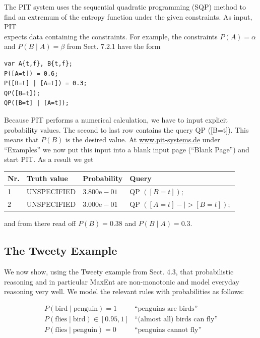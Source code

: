 \documentclass[10pt]{book}
\begin{document}
The PIT system uses the sequential quadratic programming (SQP) method to find an extremum of the entropy function under the given constraints. As input, PIT\\
expects data containing the constraints. For example, the constraints $P(A)=\alpha$ and $P(B \mid A)=\beta$ from Sect. 7.2.1 have the form
\begin{verbatim}
var A{t,f}, B{t,f};
P([A=t]) = 0.6;
P([B=t] | [A=t]) = 0.3;
QP([B=t]);
QP([B=t] | [A=t]);
\end{verbatim}

Because PIT performs a numerical calculation, we have to input explicit probability values. The second to last row contains the query QP ([B=t]). This means that $P(B)$ is the desired value. At \href{http://www.pit-systems.de}{www.pit-systems.de} under ``Examples'' we now put this input into a blank input page (``Blank Page'') and start PIT. As a result we get

\begin{center}
\begin{tabular}{llll}
\hline
Nr. & Truth value & Probability & Query \\
\hline
1 & UNSPECIFIED & $3.800 \mathrm{e}-01$ & QP $([B=t]) ;$ \\
\hline
2 & UNSPECIFIED & $3.000 \mathrm{e}-01$ & QP $([A=t]-\mid>[B=t]) ;$ \\
\hline
\end{tabular}
\end{center}

and from there read off $P(B)=0.38$ and $P(B \mid A)=0.3$.

\subsection{The Tweety Example}
We now show, using the Tweety example from Sect. 4.3, that probabilistic reasoning and in particular MaxEnt are non-monotonic and model everyday reasoning very well. We model the relevant rules with probabilities as follows:

$$
\begin{array}{ll}
P(\text{bird} \mid \text{penguin}) = 1 & \text{``penguins are birds''} \\
P(\text{flies} \mid \text{bird}) \in [0.95,1] & \text{``(almost all) birds can fly''} \\
P(\text{flies} \mid \text{penguin}) = 0 & \text{``penguins cannot fly''}
\end{array}
$$
\end{document}
